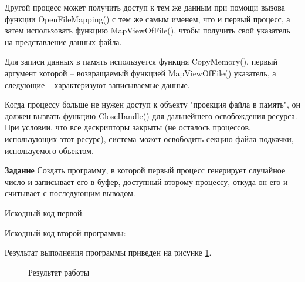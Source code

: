 \documentclass[a4paper]{article}
\begin{document}
	Другой процесс может получить доступ к тем же данным при помощи вызова функции OpenFileMapping() с тем же самым именем, что и первый процесс, а затем использовать функцию MapViewOfFile(), чтобы получить свой указатель на представление данных файла.
	
	Для записи данных в память используется функция CopyMemory(), первый аргумент которой – возвращаемый функцией MapViewOfFile() указатель, а следующие – характеризуют записываемые данные.
	
	Когда процессу больше не нужен доступ к объекту "проекция файла в память", он должен вызвать функцию CloseHandle() для дальнейшего освобождения ресурса. При условии, что все дескрипторы закрыты (не осталось процессов, использующих этот ресурс), система может освободить секцию файла подкачки, используемого объектом.
	
	\textbf{Задание} Создать программу, в которой первый процесс генерирует случайное число и записывает его в буфер, доступный второму процессу, откуда он его и считывает с последующим выводом.
	
	Исходный код первой:
	
	
	Исходный код второй программы:
	
	
	Результат выполнения программы приведен на рисунке \ref{img:task8}.
	\begin{figure}[h!]
		\caption{Результат работы}
		\label{img:task8}
	\end{figure}
	
\end{document}
